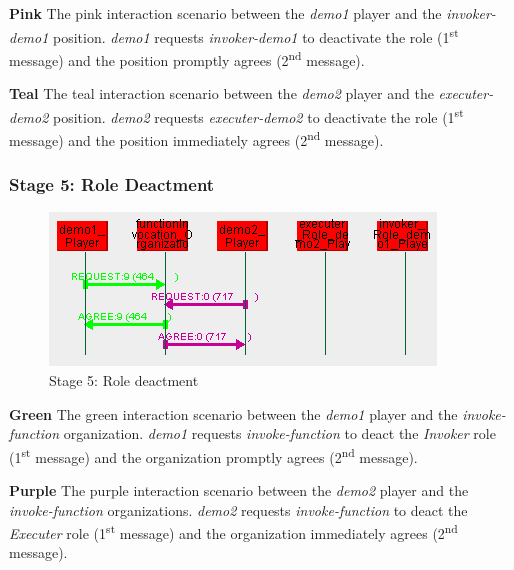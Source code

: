 \textbf{Pink} The pink interaction scenario between the \textit{demo1} player and the \textit{invoker-demo1} position.
\textit{demo1} requests \textit{invoker-demo1} to deactivate the role (1\textsuperscript{st} message) and the position promptly agrees (2\textsuperscript{nd} message).

\textbf{Teal} The teal interaction scenario between the \textit{demo2} player and the \textit{executer-demo2} position.
\textit{demo2} requests \textit{executer-demo2} to deactivate the role (1\textsuperscript{st} message) and the position immediately agrees (2\textsuperscript{nd} message).

\subsubsection*{Stage 5: Role Deactment}

\begin{figure}[H]
	\centering
	\includegraphics[width=\textwidth]{images/example1-stage5.png}
	\caption{Stage 5: Role deactment}
	\label{figure:example1-stage5}
\end{figure} 

\textbf{Green} The green interaction scenario between the \textit{demo1} player and the \textit{invoke-function} organization.
\textit{demo1} requests \textit{invoke-function} to deact the \textit{Invoker} role (1\textsuperscript{st} message) and the organization promptly agrees (2\textsuperscript{nd} message).

\textbf{Purple} The purple interaction scenario between the \textit{demo2} player and the \textit{invoke-function} organizations.
\textit{demo2} requests \textit{invoke-function} to deact the \textit{Executer} role (1\textsuperscript{st} message) and the organization immediately agrees (2\textsuperscript{nd} message).